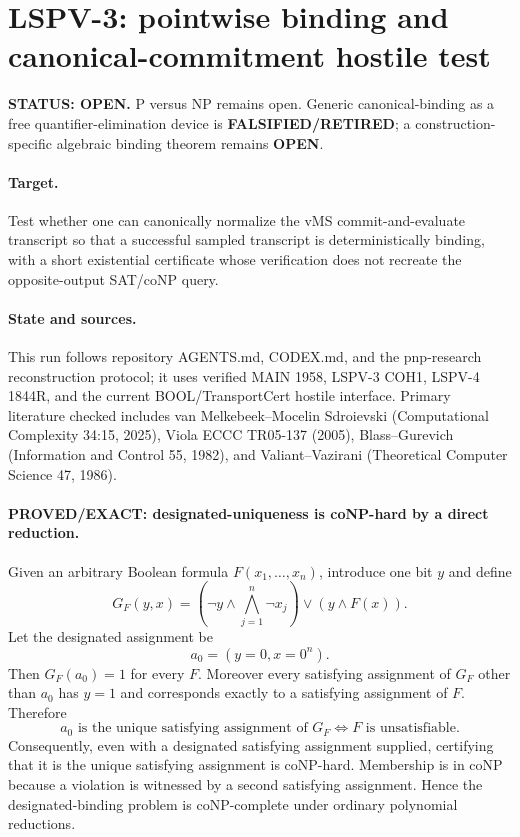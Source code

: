 \documentclass[11pt]{article}
\begin{document}
\section*{LSPV-3: pointwise binding and canonical-commitment hostile test}
\textbf{STATUS: OPEN.} P versus NP remains open. Generic canonical-binding as a free quantifier-elimination device is \textbf{FALSIFIED/RETIRED}; a construction-specific algebraic binding theorem remains \textbf{OPEN}.

\paragraph{Target.}
Test whether one can canonically normalize the vMS commit-and-evaluate transcript so that a successful sampled transcript is deterministically binding, with a short existential certificate whose verification does not recreate the opposite-output SAT/coNP query.

\paragraph{State and sources.}
This run follows repository AGENTS.md, CODEX.md, and the pnp-research reconstruction protocol; it uses verified MAIN 1958, LSPV-3 COH1, LSPV-4 1844R, and the current BOOL/TransportCert hostile interface. Primary literature checked includes van Melkebeek--Mocelin Sdroievski (Computational Complexity 34:15, 2025), Viola ECCC TR05-137 (2005), Blass--Gurevich (Information and Control 55, 1982), and Valiant--Vazirani (Theoretical Computer Science 47, 1986).

\paragraph{PROVED/EXACT: designated-uniqueness is coNP-hard by a direct reduction.}
Given an arbitrary Boolean formula $F(x_1,\ldots,x_n)$, introduce one bit $y$ and define
\[
G_F(y,x)=
(\neg y\wedge\bigwedge_{j=1}^n\neg x_j)
\vee
(y\wedge F(x)).
\]
Let the designated assignment be
\[
a_0=(y=0,x=0^n).
\]
Then $G_F(a_0)=1$ for every $F$. Moreover every satisfying assignment of $G_F$ other than $a_0$ has $y=1$ and corresponds exactly to a satisfying assignment of $F$. Therefore
\[
\boxed{a_0\text{ is the unique satisfying assignment of }G_F
\iff F\text{ is unsatisfiable}.}
\]
Consequently, even with a designated satisfying assignment supplied, certifying that it is the unique satisfying assignment is coNP-hard. Membership is in coNP because a violation is witnessed by a second satisfying assignment. Hence the designated-binding problem is coNP-complete under ordinary polynomial reductions.
\end{document}
